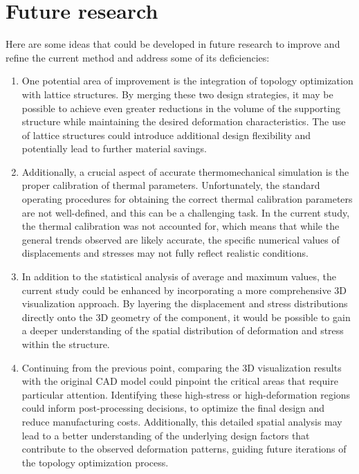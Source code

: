 \documentclass[../main.tex]{subfiles}
\begin{document}
\begin{enumerate}
\end{enumerate}

\section{Future research}

Here are some ideas that could be developed in future research to improve and refine the current method and address some of its deficiencies:

\begin{enumerate}

  \item One potential area of improvement is the integration of topology optimization with lattice structures. By merging these two design strategies, it may be possible to achieve even greater reductions in the volume of the supporting structure while maintaining the desired deformation characteristics. The use of lattice structures could introduce additional design flexibility and potentially lead to further material savings.

  \item Additionally, a crucial aspect of accurate thermomechanical simulation is the proper calibration of thermal parameters. Unfortunately, the standard operating procedures for obtaining the correct thermal calibration parameters are not well-defined, and this can be a challenging task. In the current study, the thermal calibration was not accounted for, which means that while the general trends observed are likely accurate, the specific numerical values of displacements and stresses may not fully reflect realistic conditions.  

  \item In addition to the statistical analysis of average and maximum values, the current study could be enhanced by incorporating a more comprehensive 3D visualization approach. By layering the displacement and stress distributions directly onto the 3D geometry of the component, it would be possible to gain a deeper understanding of the spatial distribution of deformation and stress within the structure.  

  \item Continuing from the previous point, comparing the 3D visualization results with the original CAD model could pinpoint the critical areas that require particular attention. Identifying these high-stress or high-deformation regions could inform post-processing decisions, to optimize the final design and reduce manufacturing costs. Additionally, this detailed spatial analysis may lead to a better understanding of the underlying design factors that contribute to the observed deformation patterns, guiding future iterations of the topology optimization process.


\end{enumerate}
\end{document}
